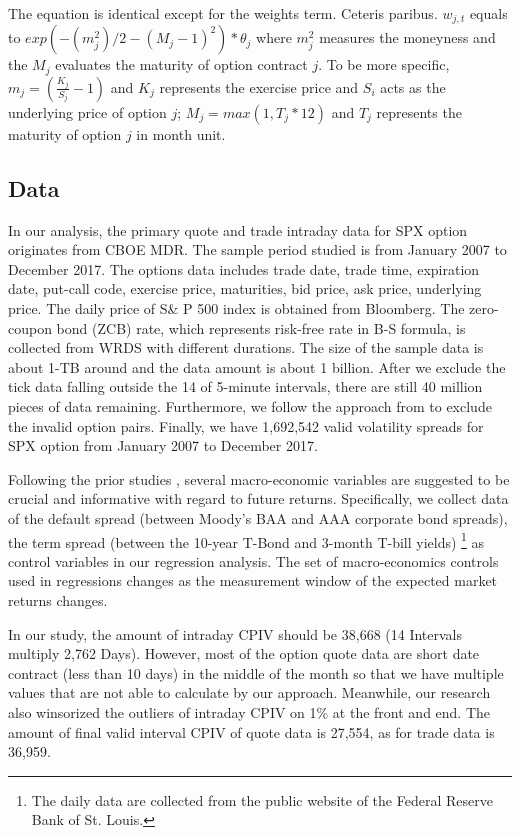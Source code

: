 \begin{enumerate}
The equation is identical except for the weights term. Ceteris paribus. $w_{j,t}$ equals to $exp(-(m_{j}^{2})/2 -(M_{j} - 1)^{2}) * \theta_{j}$ where $m_{j}^{2}$ measures the moneyness and the $M_{j}$ evaluates the maturity of option contract $j$. To be more specific, $m_{j} =  (\frac{K_{j}}{S_{j}} - 1)$ and $K_{j}$ represents the exercise price and $S_{i}$ acts as the underlying price of option $j$; $M_{j} =  max(1, T_{j}*12) $ and $T_{j}$ represents the maturity of option $j$ in month unit. 


\end{enumerate}


\subsection{Data}
In our analysis, the primary quote and trade intraday data for SPX option originates from CBOE MDR. The sample period studied is from January 2007 to December 2017. The options data includes trade date, trade time, expiration date, put-call code, exercise price, maturities, bid price, ask price, underlying price. The daily price of S\& P 500 index is obtained from Bloomberg. The zero-coupon bond (ZCB) rate, which represents risk-free rate in B-S formula, is collected from WRDS with different durations. The size of the sample data is about 1-TB around and the data amount is about 1 billion. After we exclude the tick data falling outside the 14 of 5-minute intervals, there are still 40 million pieces of data remaining. Furthermore, we follow the approach from \textcite{ofek2004limited} to exclude the invalid option pairs. Finally, we have 1,692,542 valid volatility spreads for SPX option from January 2007 to December 2017. 

Following the prior studies \textcite{bollerslev2009expected}, several macro-economic variables are suggested to be crucial and informative with regard to future returns. Specifically, we collect data of the default spread (between Moody's BAA and AAA corporate bond spreads), the term spread (between the 10-year T-Bond and 3-month T-bill yields) \footnote{The daily data are collected from the public website of the Federal Reserve Bank of St. Louis.} as control variables in our regression analysis. The set of macro-economics controls used in regressions changes as the measurement window of the expected market returns changes. 

In our study, the amount of intraday CPIV should be 38,668 (14 Intervals multiply 2,762 Days). However, most of the option quote data are short date contract (less than 10 days) in the middle of the month so that we have multiple values that are not able to calculate by our approach. Meanwhile, our research also winsorized the outliers of intraday CPIV on 1\% at the front and end. The amount of final valid interval CPIV of quote data is 27,554, as for trade data is 36,959.


